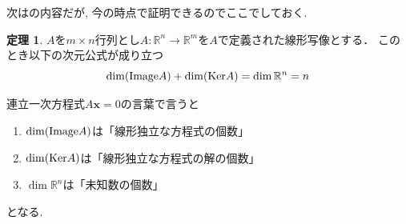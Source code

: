 \documentclass[dvipdfmx,a4paper,11pt]{article}
\newcommand{\R}{\mathbb{R}}
\theoremstyle{definition}
\newtheorem{thm}{定理}
\begin{document}
  次は\cite[2.8節]{M}の内容だが, 今の時点で証明できるのでここでしておく.
  \begin{tcolorbox}[
    colback = white,
    colframe = green!35!black,
    fonttitle = \bfseries,
    breakable = true]
    \begin{thm}\cite[定理2.9. 次元公式]{M}
\label{thm-dim}
$A$を$m \times n$行列とし$A: \R^n \to \R^m$を$A$で定義された線形写像とする． 
このとき以下の次元公式が成り立つ
$$
\dim({\rm Image}A) +  \dim ({\rm Ker}A) = \dim \R^n=n
$$
  \end{thm}
  \end{tcolorbox}
連立一次方程式$A\bm{x}=0$の言葉で言うと
\begin{enumerate}
   \setlength{\parskip}{0cm} 
  \setlength{\itemsep}{0cm}
  \item $\dim({\rm Image}A) $は「線形独立な方程式の個数」
  \item $ \dim ({\rm Ker}A) $は「線形独立な方程式の解の個数」
  \item $\dim \R^n$は「未知数の個数」
  \end{enumerate}
  となる. 
  
\end{document}
